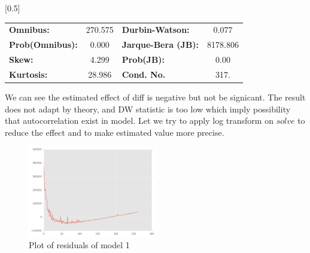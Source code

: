 \documentclass{beamer}
\begin{document}
\begin{frame}
\begin{center}
{\begin{tabular}{lccccc}
\bottomrule
\end{tabular}
}
\scalebox{0.5}[0.5]{
\begin{tabular}{lclc}
\toprule
\textbf{Omnibus:}       & 270.575 & \textbf{  Durbin-Watson:     } &    0.077  \\
\textbf{Prob(Omnibus):} &   0.000 & \textbf{  Jarque-Bera (JB):  } & 8178.806  \\
\textbf{Skew:}          &   4.299 & \textbf{  Prob(JB):          } &     0.00  \\
\textbf{Kurtosis:}      &  28.986 & \textbf{  Cond. No.          } &     317.  \\
\bottomrule
\end{tabular}
}
\end{center}

\end{frame}

\begin{frame}

We can see the estimated effect of diff is negative but not be signicant. The result does not adapt by theory,
and DW statistic is too low which imply possibility that autocorrelation exist in model. 
Let we try to apply log transform on $solve$ to reduce the effect and to make estimated value more precise.

\begin{figure}[h]
\includegraphics[width=0.5\textwidth, inner]{model1-resid.png}
\caption{Plot of residuals of model 1}
\end{figure}

\end{frame}
\end{document}
